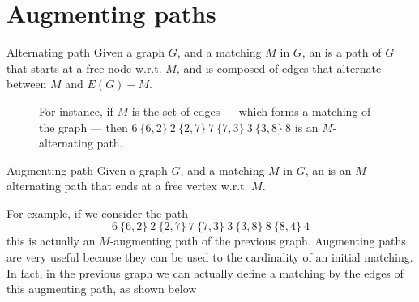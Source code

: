 \documentclass[a4paper, 12pt]{report}
\begin{document}
    \section{Augmenting paths}

    \begin{frameddefn}{Alternating path}
        Given a graph $G$, and a matching $M$ in $G$, an  is a path of $G$ that starts at a free node w.r.t. $M$, and is composed of edges that alternate between $M$ and $E(G) - M$.
    \end{frameddefn}

    \begin{figure}[H]
        \centering
        \caption{For instance, if $M$ is the set of  edges --- which forms a matching of the graph --- then $6 \ \{6, 2\} \ 2 \ \{2, 7\} \ 7 \ \{7, 3\} \ 3 \ \{3, 8\} \ 8$ is an $M$-alternating path.}
    \end{figure}
    
    \begin{frameddefn}{Augmenting path}
        Given a graph $G$, and a matching $M$ in $G$, an  is an $M$-alternating path that ends at a free vertex w.r.t. $M$.
    \end{frameddefn}

    For example, if we consider the path $$6 \ \{6, 2\} \ 2 \ \{2, 7\} \ 7 \ \{7, 3\} \ 3 \ \{3, 8\} \ 8 \ \{8, 4 \} \ 4$$ this is actually an $M$-augmenting path of the previous graph. Augmenting paths are very useful because they can be used to  the cardinality of an initial matching. In fact, in the previous graph we can actually define a  matching by  the edges of this augmenting path, as shown below
\end{document}
